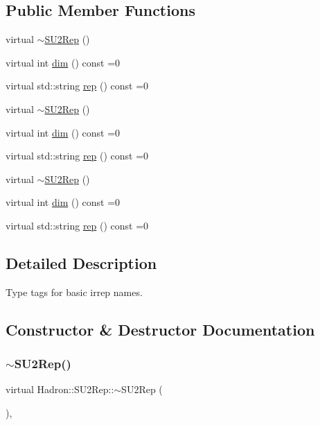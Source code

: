 \subsection*{Public Member Functions}
\begin{DoxyCompactItemize}
\item 
virtual \mbox{\hyperlink{structHadron_1_1SU2Rep_a48791a8dcceacd9a2a4cc08788603a52}{$\sim$\+S\+U2\+Rep}} ()
\item 
virtual int \mbox{\hyperlink{structHadron_1_1SU2Rep_a4feae466a054ad829ef37a71b46667b8}{dim}} () const =0
\item 
virtual std\+::string \mbox{\hyperlink{structHadron_1_1SU2Rep_a97c63ec12042453d3ac8e9ea612b2743}{rep}} () const =0
\item 
virtual \mbox{\hyperlink{structHadron_1_1SU2Rep_a48791a8dcceacd9a2a4cc08788603a52}{$\sim$\+S\+U2\+Rep}} ()
\item 
virtual int \mbox{\hyperlink{structHadron_1_1SU2Rep_a4feae466a054ad829ef37a71b46667b8}{dim}} () const =0
\item 
virtual std\+::string \mbox{\hyperlink{structHadron_1_1SU2Rep_a97c63ec12042453d3ac8e9ea612b2743}{rep}} () const =0
\item 
virtual \mbox{\hyperlink{structHadron_1_1SU2Rep_a48791a8dcceacd9a2a4cc08788603a52}{$\sim$\+S\+U2\+Rep}} ()
\item 
virtual int \mbox{\hyperlink{structHadron_1_1SU2Rep_a4feae466a054ad829ef37a71b46667b8}{dim}} () const =0
\item 
virtual std\+::string \mbox{\hyperlink{structHadron_1_1SU2Rep_a97c63ec12042453d3ac8e9ea612b2743}{rep}} () const =0
\end{DoxyCompactItemize}


\subsection{Detailed Description}
Type tags for basic irrep names. 

\subsection{Constructor \& Destructor Documentation}
\mbox{\label{structHadron_1_1SU2Rep_a48791a8dcceacd9a2a4cc08788603a52}} 
\subsubsection{\texorpdfstring{$\sim$SU2Rep()}{~SU2Rep()}\hspace{0.1cm}{\footnotesize\ttfamily [1/3]}}
{\footnotesize\ttfamily virtual Hadron\+::\+S\+U2\+Rep\+::$\sim$\+S\+U2\+Rep (\begin{DoxyParamCaption}{ }\end{DoxyParamCaption})\hspace{0.3cm}{\ttfamily [inline]}, {\ttfamily [virtual]}}

